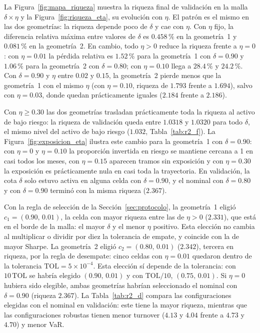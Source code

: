 La Figura~\ref{fig:mapa_riqueza} muestra la riqueza final de validación en la malla $\delta\times\eta$ y la Figura~\ref{fig:riqueza_eta}, su evolución con $\eta$. El patrón es el mismo en las dos geometrías: la riqueza depende poco de $\delta$ y cae con $\eta$. Con $\eta$ fijo, la diferencia relativa máxima entre valores de $\delta$ es $0.458\,\%$ en la geometría~1 y $0.081\,\%$ en la geometría~2. En cambio, todo $\eta>0$ reduce la riqueza frente a $\eta=0$: con $\eta=0.01$ la pérdida relativa es $1.52\,\%$ para la geometría~1 con $\delta=0.90$ y $1.06\,\%$ para la geometría~2 con $\delta=0.80$; con $\eta=0.10$ llega a $28.4\,\%$ y $24.2\,\%$. Con $\delta=0.90$ y $\eta$ entre $0.02$ y $0.15$, la geometría~2 pierde menos que la geometría~1 con el mismo $\eta$ (con $\eta=0.10$, riqueza de $1.793$ frente a $1.694$), salvo con $\eta=0.03$, donde quedan prácticamente iguales ($2.184$ frente a $2.186$).

Con $\eta\ge0.30$ las dos geometrías trasladan prácticamente toda la riqueza al activo de bajo riesgo: la riqueza de validación queda entre $1.0318$ y $1.0320$ para todo $\delta$, el mismo nivel del activo de bajo riesgo ($1.032$, Tabla~\ref{tab:r2_f}). La Figura~\ref{fig:exposicion_eta} ilustra este cambio para la geometría~1 con $\delta=0.90$: con $\eta=0$ y $\eta=0.10$ la proporción invertida en riesgo se mantiene cercana a 1 en casi todos los meses, con $\eta=0.15$ aparecen tramos sin exposición y con $\eta=0.30$ la exposición es prácticamente nula en casi toda la trayectoria. En validación, la cota $\delta$ solo estuvo activa en alguna celda con $\delta=0.90$, y el nominal con $\delta=0.80$ y con $\delta=0.90$ terminó con la misma riqueza ($2.367$).

Con la regla de selección de la Sección~\ref{sec:protocolo}, la geometría~1 eligió $c_1=(0.90,\,0.01)$, la celda con mayor riqueza entre las de $\eta>0$ ($2.331$), que está en el borde de la malla: el mayor $\delta$ y el menor $\eta$ positivo. Esta elección no cambia al multiplicar o dividir por diez la tolerancia de empate, y coincide con la de mayor Sharpe. La geometría~2 eligió $c_2=(0.80,\,0.01)$ ($2.342$), tercera en riqueza, por la regla de desempate: cinco celdas con $\eta=0.01$ quedaron dentro de la tolerancia $\mathrm{TOL}=5\times10^{-4}$. Esta elección sí depende de la tolerancia: con $10\,\mathrm{TOL}$ se habría elegido $(0.90,\,0.01)$ y con $\mathrm{TOL}/10$, $(0.75,\,0.01)$. Si $\eta=0$ hubiera sido elegible, ambas geometrías habrían seleccionado el nominal con $\delta=0.90$ (riqueza $2.367$). La Tabla~\ref{tab:r2_d} compara las configuraciones elegidas con el nominal en validación: este tiene la mayor riqueza, mientras que las configuraciones robustas tienen menor turnover ($4.13$ y $4.04$ frente a $4.73$ y $4.70$) y menor VaR.

